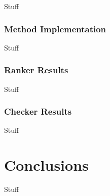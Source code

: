 \documentclass[ms,electronic,twosidetoc,letterpaper,chaptercenter,parttop,lol,lof,lot]{byumsphd}
\begin{document}
Stuff

\subsection{Method Implementation}

Stuff

\subsection{Ranker Results}

Stuff

\subsection{Checker Results}

Stuff

\chapter{Conclusions}

Stuff

\nocite{testentry}



\end{document}
